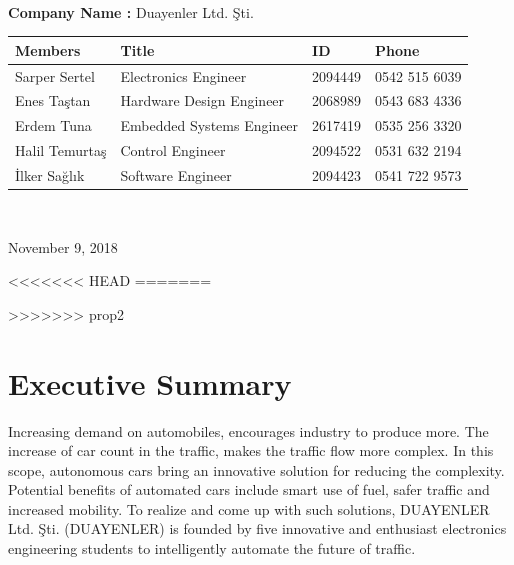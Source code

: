 \documentclass[a4paper,12pt]{article}
\begin{document}
\begin{titlepage}
\begin{minipage}[r]{0.35\textwidth}
\end{minipage}\\[1cm]
\begin{minipage}{\textwidth}
	\begin{flushleft}
		\large{\textbf{Company Name :}}	Duayenler Ltd. Şti.\\
		\begin{table}[H]
			\begin{tabular}{l l l l}
				\hline
				\textbf{Members}&\textbf{Title}& \textbf{ID}&\textbf{Phone} \\ \hline
				Sarper Sertel & Electronics Engineer& 2094449 & 0542 515 6039  \\ 
				Enes Taştan & Hardware Design Engineer & 2068989 & 0543 683 4336  \\ 
				Erdem Tuna & Embedded Systems Engineer& 2617419 & 0535 256 3320  \\ 
				Halil Temurtaş & Control Engineer& 2094522 & 0531 632 2194  \\
				İlker Sağlık & Software Engineer& 2094423 & 0541 722 9573  \\ \hline
				
				
			\end{tabular}
		\end{table}
	\end{flushleft}
\end{minipage}\\[1cm]

\begin{flushbottom}
{\large November 9, 2018} %
\end{flushbottom}

\end{titlepage}

\blankpage
\tableofcontents
\newpage


<<<<<<< HEAD
=======

>>>>>>> prop2
\section{Executive Summary}

	Increasing demand on automobiles, encourages industry to produce more. The increase of car count in the traffic, makes the traffic flow more complex. In this scope, autonomous cars bring an innovative solution for reducing the complexity. Potential benefits of automated cars include smart use of fuel, safer traffic and increased mobility. To realize and come up with such solutions, DUAYENLER Ltd. Şti. (DUAYENLER) is founded by five innovative and enthusiast electronics engineering students to intelligently automate the future of traffic.\\
	
\end{document}

